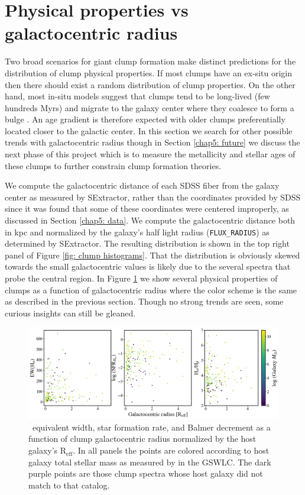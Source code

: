 \section{Physical properties vs galactocentric radius}
\label{chap5: galactocentric radius}

Two broad scenarios for giant clump formation make distinct predictions for the distribution of clump physical properties. If most clumps have an ex-situ origin then there should exist a random distribution of clump properties. On the other hand, most in-situ models suggest that clumps tend to be long-lived (few hundreds Myrs) and migrate to the galaxy center where they coalesce to form a bulge \citep{Bournaud2016}. An age gradient is therefore expected with older clumps preferentially located closer to the galactic center. In this section we search for other possible trends with galactocentric radius though in Section \ref{chap5: future} we discuss the next phase of this project which is to measure the metallicity and stellar ages of these clumps to further constrain clump formation theories. 


We compute the galactocentric distance of each SDSS fiber from the galaxy center as measured by SExtractor, rather than the coordinates provided by SDSS since it was found  that some of these coordinates were centered improperly, as discussed in Section \ref{chap5: data}. We compute the galactocentric distance both in kpc and normalized by the galaxy's half light radius (\texttt{FLUX\_RADIUS}) as determined by SExtractor. The resulting distribution is shown in the top right panel of Figure \ref{fig: clump histograms}. That the distribution is obviously skewed towards the small galactocentric values is likely due to the several spectra that probe the central region. In Figure \ref{fig: galactocentric radius relations} we show several physical properties of clumps as a function of galactocentric radius where the color scheme is the same as described in the previous section. Though no strong trends are seen, some curious insights can still be gleaned.
  

\begin{figure}
\includegraphics[width=\textwidth]{Figures/clump_galactocentric_Reff.png}
\caption[\ha~EW, SFR, Balmer decrement as a function of clump galactocentric radius.]{\ha~equivalent width, star formation rate, and Balmer decrement as a function of clump galactocentric radius normalized by the host galaxy's R$_{\mathrm{eff}}$. In all panels the points are colored according to host galaxy total stellar mass as measured by \cite{Salim2016} in the GSWLC. The dark purple points are those clump spectra whose host galaxy did not match to that catalog.}
\label{fig: galactocentric radius relations}
\end{figure}


